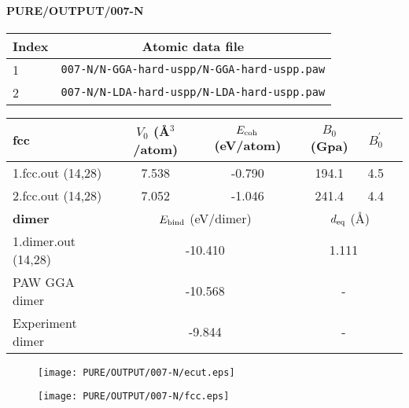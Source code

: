 \documentclass[onecolumn]{revtex4}
\begin{document}
\paragraph*{\bf{PURE/OUTPUT/007-N}}
\begin{center}
\begin{tabular}{lc}
\hline
Index & Atomic data file \\
\hline
1 & \verb?007-N/N-GGA-hard-uspp/N-GGA-hard-uspp.paw?\\
2 & \verb?007-N/N-LDA-hard-uspp/N-LDA-hard-uspp.paw?\\
\hline
\end{tabular}
\end{center}
\begin{center}
\begin{tabular}{lccccc}
\hline
\hline
\bf{fcc}&$V_0$ (\AA$^3$/atom)&$E_{\rm coh}$ (eV/atom)&$B_0$ (Gpa)&$B_0^{'}$& \\
\hline
1.fcc.out (14,28)& 7.538 &-0.790 & 194.1 & 4.5 & \\ 
2.fcc.out (14,28)& 7.052 &-1.046 & 241.4 & 4.4 & \\ 
\hline
\hline
\bf{dimer}&\multicolumn{2}{c}{$E_{\rm bind}$ (eV/dimer)}&\multicolumn{3}{c}{$d_{\rm eq}$ (\AA)} \\
\hline
1.dimer.out (14,28)&\multicolumn{2}{c}{-10.410}&\multicolumn{2}{c}{1.111} \\ 
PAW GGA dimer~\cite{Paier_JCP122_2005} & \multicolumn{2}{c}{-10.568} & \multicolumn{2}{c}{-} \\ %
Experiment dimer~\cite{Paier_JCP122_2005} & \multicolumn{2}{c}{-9.844} & \multicolumn{2}{c}{-} \\ %
\hline
\hline
\end{tabular}
\end{center}
\begin{figure}[h] 
\centering 
\texttt{[image: PURE/OUTPUT/007-N/ecut.eps]}
\end{figure}
\begin{figure}[h] 
\centering 
\texttt{[image: PURE/OUTPUT/007-N/fcc.eps]}
\end{figure}
\newpage
\end{document}
